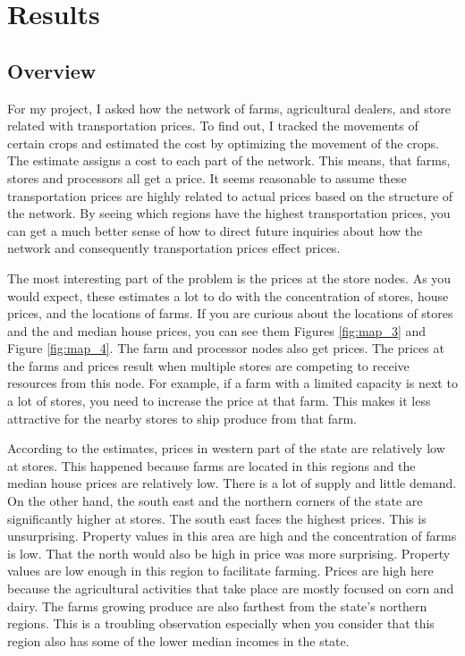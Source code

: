 \documentclass{report}
\begin{document}
\chapter{Results}

\section{Overview}

For my project, I asked how the network of farms, agricultural dealers, and store related with transportation prices. To find out, I tracked the movements of certain crops and estimated the cost by optimizing the movement of the crops. The estimate assigns a cost to each part of the network. This means, that farms, stores and processors all get a price. It seems reasonable to assume these transportation prices are highly related to actual prices based on the structure of the network. By seeing which regions have the highest transportation prices, you can get a much better sense of how to direct future inquiries about how the network and consequently transportation prices effect prices. 

The most interesting part of the problem is the prices at the store nodes. As you would expect, these estimates a lot to do with the concentration of stores, house prices, and the locations of farms. If you are curious about the locations of stores and the and median house prices, you can see them Figures \ref{fig:map_3} and Figure \ref{fig:map_4}. The farm and processor nodes also get prices. The prices at the farms and prices result when multiple stores are competing to receive resources from this node. For example, if a farm with a limited capacity is next to a lot of stores, you need to increase the price at that farm. This makes it less attractive for the nearby stores to ship produce from that farm.

According to the estimates, prices in western part of the state are relatively low at stores. This happened because farms are located in this regions and the median house prices are relatively low. There is a lot of supply and little demand.  On the other hand, the south east and the northern corners of the state are significantly higher at stores. The south east faces the highest prices. This is unsurprising. Property values in this area are high and the concentration of farms is low. That the north would also be high in price was more surprising. Property values are low enough in this region to facilitate farming.  Prices are high here because the agricultural activities that take place are mostly focused on corn and dairy. The farms growing produce are also farthest from the state's northern regions. This is a troubling observation especially when you consider that this region also has some of the lower median incomes in the state. 
\end{document}
